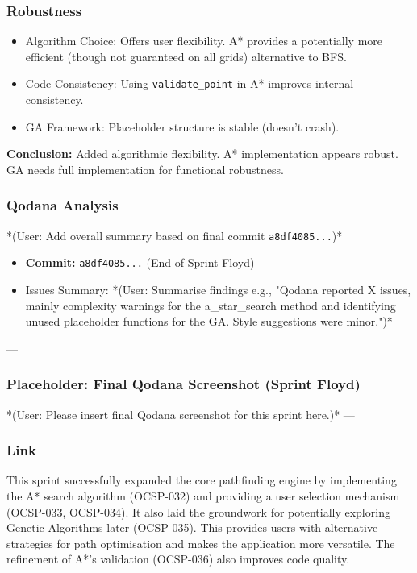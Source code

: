 \subsubsection{Robustness}
\begin{itemize}
	\item Algorithm Choice: Offers user flexibility. A* provides a potentially more efficient (though not guaranteed on all grids) alternative to BFS.
	\item Code Consistency: Using \verb|validate_point| in A* improves internal consistency.
	\item GA Framework: Placeholder structure is stable (doesn't crash).
\end{itemize}
\textbf{Conclusion:} Added algorithmic flexibility. A* implementation appears robust. GA needs full implementation for functional robustness.

\subsubsection{Qodana Analysis}
*(User: Add overall summary based on final commit \verb|a8df4085...|)*
\begin{itemize}
	\item \textbf{Commit:} \verb|a8df4085...| (End of Sprint Floyd)
	\item Issues Summary: *(User: Summarise findings e.g., "Qodana reported X issues, mainly complexity warnings for the a_star_search method and identifying unused placeholder functions for the GA. Style suggestions were minor.")*
\end{itemize}

--- %
\subsubsection*{Placeholder: Final Qodana Screenshot (Sprint Floyd)}
*(User: Please insert final Qodana screenshot for this sprint here.)*
---

\subsubsection{Link}
This sprint successfully expanded the core pathfinding engine by implementing the A* search algorithm (OCSP-032) and providing a user selection mechanism (OCSP-033, OCSP-034). It also laid the groundwork for potentially exploring Genetic Algorithms later (OCSP-035). This provides users with alternative strategies for path optimisation and makes the application more versatile. The refinement of A*'s validation (OCSP-036) also improves code quality.

